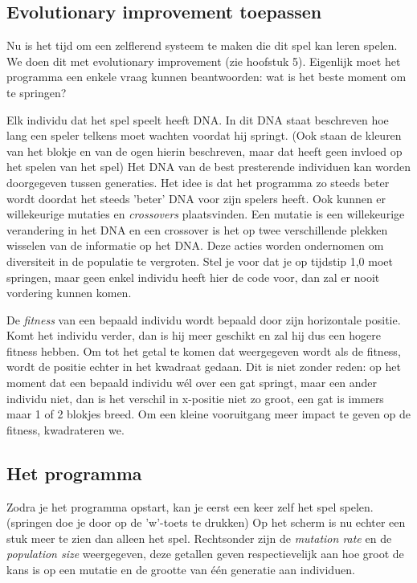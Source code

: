 \documentclass[a4paper,titlepage]{article}
\begin{document}
\subsection{Evolutionary improvement toepassen}
Nu is het tijd om een zelflerend systeem te maken die dit spel kan leren spelen. We doen dit met evolutionary improvement (zie hoofstuk 5). Eigenlijk moet het programma een enkele vraag kunnen beantwoorden: wat is het beste moment om te springen?

Elk individu dat het spel speelt heeft DNA. In dit DNA staat beschreven hoe lang een speler telkens moet wachten voordat hij springt. (Ook staan de kleuren van het blokje en van de ogen hierin beschreven, maar dat heeft geen invloed op het spelen van het spel) Het DNA van de best presterende individuen kan worden doorgegeven tussen generaties. Het idee is dat het programma zo steeds beter wordt doordat het steeds 'beter' DNA voor zijn spelers heeft.
Ook kunnen er willekeurige mutaties en \textit{crossovers} plaatsvinden. Een mutatie is een willekeurige verandering in het DNA en een crossover is het op twee verschillende plekken wisselen van de informatie op het DNA. Deze acties worden ondernomen om diversiteit in de populatie te vergroten. Stel je voor dat je op tijdstip 1,0 moet springen, maar geen enkel individu heeft hier de code voor, dan zal er nooit vordering kunnen komen.

De \textit{fitness} van een bepaald individu wordt bepaald door zijn horizontale positie. Komt het individu verder, dan is hij meer geschikt en zal hij dus een hogere fitness hebben. Om tot het getal te komen dat weergegeven wordt als de fitness, wordt de positie echter in het kwadraat gedaan. Dit is niet zonder reden: op het moment dat een bepaald individu w\'el over een gat springt, maar een ander individu niet, dan is het verschil in x-positie niet zo groot, een gat is immers maar 1 of 2 blokjes breed. Om een kleine vooruitgang meer impact te geven op de fitness, kwadrateren we.

\subsection{Het programma}
Zodra je het programma opstart, kan je eerst een keer zelf het spel spelen. (springen doe je door op de 'w'-toets te drukken) Op het scherm is nu echter een stuk meer te zien dan alleen het spel. Rechtsonder zijn de \textit{mutation rate} en de \textit{population size} weergegeven, deze getallen geven respectievelijk aan hoe groot de kans is op een mutatie en de grootte van één generatie aan individuen.
\end{document}
